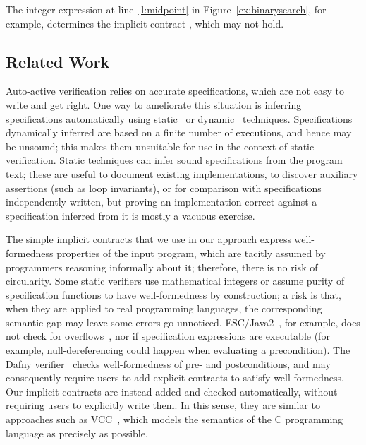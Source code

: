The integer expression at line~\ref{l:midpoint} in Figure~\ref{ex:binarysearch}, for example, determines the implicit contract , which may not hold.


\subsection{Related Work}

Auto-active verification relies on accurate specifications, which are not easy to write and get right.
One way to ameliorate this situation is inferring specifications automatically using static~\cite{CHANG05,KOVACS09,FURIA10} or dynamic~\cite{ERNST01,WEI11,WASYLKOVSKI11} techniques.
Specifications dynamically inferred are based on a finite number of executions, and hence may be unsound; this makes them unsuitable for use in the context of static verification.
Static techniques can infer sound specifications from the program text; these are useful to document existing implementations, to discover auxiliary assertions (such as loop invariants), or for comparison with specifications independently written, but proving an implementation correct against a specification inferred from it is mostly a vacuous exercise.

The simple implicit contracts that we use in our approach express well-formedness properties of the input program, which are tacitly assumed by programmers reasoning informally about it; therefore, there is no risk of circularity.
Some static verifiers use mathematical integers or assume purity of specification functions to have well-formedness by construction; a risk is that, when they are applied to real programming languages, the corresponding semantic gap may leave some errors go unnoticed.
ESC/Java2~\cite{COK05}, for example, does not check for overflows~\cite{KINIRY06}, nor if specification expressions are executable (for example, null-dereferencing could happen when evaluating a precondition).
The Dafny verifier~\cite{LEINO10} checks well-formedness of pre- and postconditions, and may consequently require users to add explicit contracts to satisfy well-formedness. Our implicit contracts are instead added and checked automatically, without requiring users to explicitly write them.
In this sense, they are similar to approaches such as VCC~\cite{COHEN09}, which models the semantics of the C programming language as precisely as possible.


